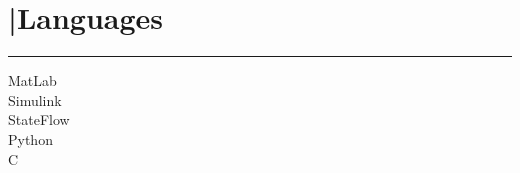 \section{\textcolor{gold}{\faCode}|Languages}
\noindent\color{blue}\rule{5.5cm}{0.4pt}


MatLab \hfill \faCircle \space \faCircle \space \faCircle \space \faCircle \space \faCircleO \\
Simulink \hfill \faCircle \space \faCircle \space \faCircle \space \faCircle \space \faCircleO \\
StateFlow \hfill \faCircle \space \faCircle \space \faCircle \space \faCircleO \space \faCircleO \\
Python \hfill \faCircle \space \faCircle \space \faCircle \space \faCircleO \space \faCircleO \\
C \hfill \faCircle \space \faCircle \space \faCircle \space \faCircleO \space \faCircleO \\


